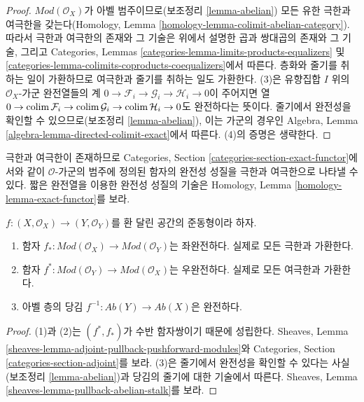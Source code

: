 \begin{proof}
$\textit{Mod}(\mathcal{O}_X)$가 아벨 범주이므로(보조정리 \ref{lemma-abelian})
모든 유한 극한과 여극한을 갖는다(Homology, Lemma
\ref{homology-lemma-colimit-abelian-category}). 따라서 극한과 여극한의 존재와
그 기술은 위에서 설명한 곱과 쌍대곱의 존재와 그 기술, 그리고 Categories,
Lemmas \ref{categories-lemma-limits-products-equalizers} 및
\ref{categories-lemma-colimits-coproducts-coequalizers}에서 따른다.
층화와 줄기를 취하는 일이 가환하므로 여극한과 줄기를 취하는 일도 가환한다.
(3)은 유향집합 $I$ 위의 $\mathcal{O}_X$-가군 완전열들의 계
$0 \to \mathcal{F}_i \to \mathcal{G}_i \to \mathcal{H}_i \to 0$이 주어지면 열
$0 \to \mathop{\mathrm{colim}}\nolimits \mathcal{F}_i \to \mathop{\mathrm{colim}}\nolimits \mathcal{G}_i \to
\mathop{\mathrm{colim}}\nolimits \mathcal{H}_i \to 0$도 완전하다는 뜻이다. 줄기에서 완전성을 확인할 수
있으므로(보조정리 \ref{lemma-abelian}), 이는 가군의 경우인 Algebra, Lemma
\ref{algebra-lemma-directed-colimit-exact}에서 따른다. (4)의 증명은 생략한다.
\end{proof}

\noindent
극한과 여극한이 존재하므로 Categories, Section
\ref{categories-section-exact-functor}에서와 같이 $\mathcal{O}$-가군의 범주에
정의된 함자의 완전성 성질을 극한과 여극한으로 나타낼 수 있다.
짧은 완전열을 이용한 완전성 성질의 기술은 Homology, Lemma
\ref{homology-lemma-exact-functor}를 보라.

\begin{lemma}
\label{lemma-exactness-pushforward-pullback}
$f : (X, \mathcal{O}_X) \to (Y, \mathcal{O}_Y)$를 환 달린 공간의 준동형이라 하자.
\begin{enumerate}
\item 함자 $f_* : \textit{Mod}(\mathcal{O}_X) \to \textit{Mod}(\mathcal{O}_Y)$는
좌완전하다. 실제로 모든 극한과 가환한다.
\item 함자 $f^* : \textit{Mod}(\mathcal{O}_Y) \to \textit{Mod}(\mathcal{O}_X)$는
우완전하다. 실제로 모든 여극한과 가환한다.
\item 아벨 층의 당김 $f^{-1} : \textit{Ab}(Y) \to \textit{Ab}(X)$은 완전하다.
\end{enumerate}
\end{lemma}

\begin{proof}
(1)과 (2)는 $(f^*, f_*)$가 수반 함자쌍이기 때문에 성립한다. Sheaves, Lemma
\ref{sheaves-lemma-adjoint-pullback-pushforward-modules}와 Categories, Section
\ref{categories-section-adjoint}를 보라. (3)은 줄기에서 완전성을 확인할 수 있다는
사실(보조정리 \ref{lemma-abelian})과 당김의 줄기에 대한 기술에서 따른다.
Sheaves, Lemma \ref{sheaves-lemma-pullback-abelian-stalk}를 보라.
\end{proof}

